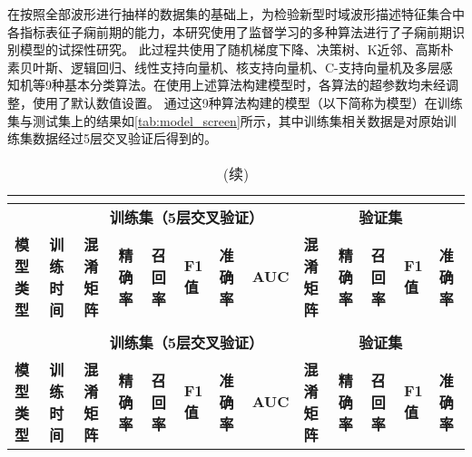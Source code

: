 在按照全部波形进行抽样的数据集的基础上，为检验新型时域波形描述特征集合中各指标表征子痫前期的能力，本研究使用了监督学习的多种算法进行了子痫前期识别模型的试探性研究\cite{scikit-learn}。
此过程共使用了随机梯度下降、决策树、K近邻、高斯朴素贝叶斯、逻辑回归、线性支持向量机、核支持向量机、C-支持向量机及多层感知机等9种基本分类算法。在使用上述算法构建模型时，各算法的超参数均未经调整，使用了默认数值设置\cite{scikit-learn}。
通过这9种算法构建的模型（以下简称为模型）在训练集与测试集上的结果如\autoref{tab:model_screen}所示，其中训练集相关数据是对原始训练集数据经过5层交叉验证后得到的。
\begin{landscape}
      \begin{longtable}{m{3cm}<{\centering}m{1.7cm}<{\centering}m{2.3cm}<{\centering}m{1cm}<{\centering}m{1cm}<{\centering}m{1cm}<{\centering}m{1cm}<{\centering}m{1cm}<{\centering}m{2cm}<{\centering}m{1cm}<{\centering}m{1cm}<{\centering}m{1cm}<{\centering}m{1cm}<{\centering}}
            \caption{初筛结果}\\
            \label{tab:model_screen}\\
            \toprule
            &  & \multicolumn{6}{c}{\textbf{训练集（5层交叉验证）}} & \multicolumn{5}{c}{\textbf{验证集}}                                                                                                                                                                                                      \\
            \multirow{-2}{*}{\textbf{模型类型}} & \multirow{-2}{*}{\textbf{训练时间}} & \textbf{混淆矩阵} &  \textbf{精确率} &  \textbf{召回率} &  \textbf{F1值} &  \textbf{准确率} &  \textbf{AUC} &  \textbf{混淆矩阵} &  \textbf{精确率} &  \textbf{召回率} &  \textbf{F1值} &  \textbf{准确率}    \\
            \midrule
            \endfirsthead
            \caption[]{(续)}\\
            \midrule
            &  & \multicolumn{6}{c}{\textbf{训练集（5层交叉验证）}} & \multicolumn{5}{c}{\textbf{验证集}}                                                                                                                                                                                                      \\
            \multirow{-2}{*}{\textbf{模型类型}} & \multirow{-2}{*}{\textbf{训练时间}} & \textbf{混淆矩阵} &  \textbf{精确率} &  \textbf{召回率} &  \textbf{F1值} &  \textbf{准确率} &  \textbf{AUC} &  \textbf{混淆矩阵} &  \textbf{精确率} &  \textbf{召回率} &  \textbf{F1值} &  \textbf{准确率}    \\

\end{longtable}
\end{landscape}
